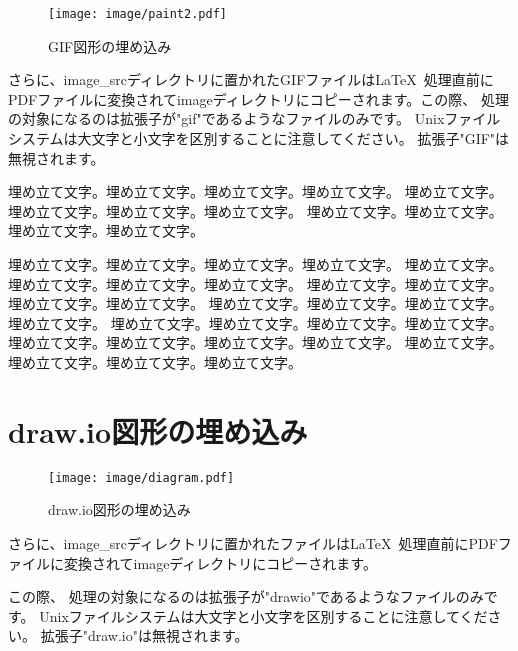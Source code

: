 \begin{wrapfigure}[10]{O}[0pt]{0\textwidth}
    \texttt{[image: image/paint2.pdf]}
    \caption{GIF図形の埋め込み}\label{embeded_gif}
\end{wrapfigure}


さらに、image\_srcディレクトリに置かれたGIFファイルは\LaTeX\
処理直前にPDFファイルに変換されてimageディレクトリにコピーされます。この際、
処理の対象になるのは拡張子が"gif"であるようなファイルのみです。
Unixファイルシステムは大文字と小文字を区別することに注意してください。
拡張子"GIF"は無視されます。

埋め立て文字。埋め立て文字。埋め立て文字。埋め立て文字。
埋め立て文字。埋め立て文字。埋め立て文字。埋め立て文字。
埋め立て文字。埋め立て文字。埋め立て文字。埋め立て文字。

埋め立て文字。埋め立て文字。埋め立て文字。埋め立て文字。
埋め立て文字。埋め立て文字。埋め立て文字。埋め立て文字。
埋め立て文字。埋め立て文字。埋め立て文字。埋め立て文字。
埋め立て文字。埋め立て文字。埋め立て文字。埋め立て文字。
埋め立て文字。埋め立て文字。埋め立て文字。埋め立て文字。
埋め立て文字。埋め立て文字。埋め立て文字。埋め立て文字。
埋め立て文字。埋め立て文字。埋め立て文字。埋め立て文字。


\section{draw.io図形の埋め込み}

\begin{wrapfigure}[10]{O}[0pt]{0\textwidth}
    \texttt{[image: image/diagram.pdf]}
    \caption{draw.io図形の埋め込み}\label{embeded_drawio}
\end{wrapfigure}

さらに、image\_srcディレクトリに置かれたファイルは\LaTeX\
処理直前にPDFファイルに変換されてimageディレクトリにコピーされます。

この際、
処理の対象になるのは拡張子が"drawio"であるようなファイルのみです。
Unixファイルシステムは大文字と小文字を区別することに注意してください。
拡張子"draw.io"は無視されます。

